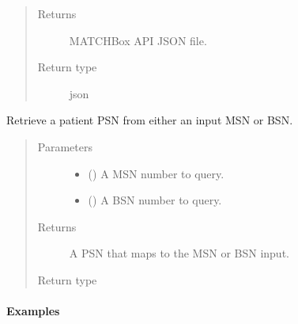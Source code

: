 \documentclass[letterpaper,10pt,english]{sphinxmanual}
\begin{document}
\begin{fulllineitems}
\begin{fulllineitems}
\begin{quote}
\begin{description}


\item[{Returns}] \leavevmode
MATCHBox API JSON file.

\item[{Return type}] \leavevmode
json

\end{description}\end{quote}

\end{fulllineitems}


\begin{fulllineitems}
\label{\detokenize{matchbox_api_utils:matchbox_api_utils.match_data.MatchData.get_psn}}
Retrieve a patient PSN from either an input MSN or BSN.
\begin{quote}\begin{description}
\item[{Parameters}] \leavevmode\begin{itemize}
\item {} 
 () \textendash{} A MSN number to query.

\item {} 
 () \textendash{} A BSN number to query.

\end{itemize}

\item[{Returns}] \leavevmode
A PSN that maps to the MSN or BSN input.

\item[{Return type}] \leavevmode
{}

\end{description}\end{quote}
\paragraph{Examples}


\end{fulllineitems}
\end{fulllineitems}
\end{document}
